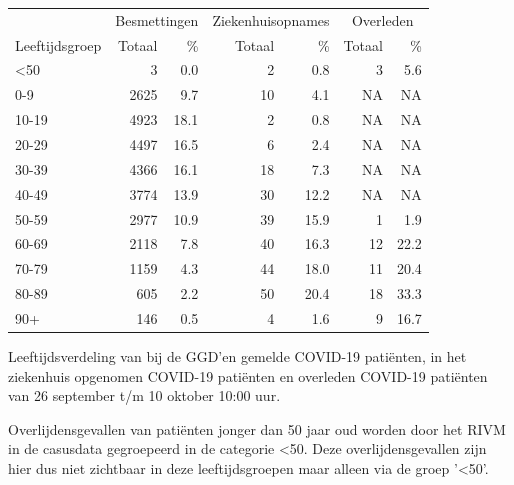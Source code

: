 \documentclass[
  english,
  man,floatsintext]{apa6}
\begin{document}
\begin{table}
\centering\begingroup\fontsize{11}{13}\selectfont

\begin{threeparttable}
\begin{tabular}{lrrrrrr}
\toprule
\multicolumn{1}{c}{ } & \multicolumn{2}{c}{Besmettingen} & \multicolumn{2}{c}{Ziekenhuisopnames} & \multicolumn{2}{c}{Overleden} \\
\cmidrule(l{3pt}r{3pt}){2-3} \cmidrule(l{3pt}r{3pt}){4-5} \cmidrule(l{3pt}r{3pt}){6-7}
Leeftijdsgroep & Totaal & \% & Totaal & \% & Totaal & \%\\
\midrule
<50 & 3 & 0.0 & 2 & 0.8 & 3 & 5.6\\
0-9 & 2625 & 9.7 & 10 & 4.1 & NA & NA\\
10-19 & 4923 & 18.1 & 2 & 0.8 & NA & NA\\
20-29 & 4497 & 16.5 & 6 & 2.4 & NA & NA\\
30-39 & 4366 & 16.1 & 18 & 7.3 & NA & NA\\
40-49 & 3774 & 13.9 & 30 & 12.2 & NA & NA\\
50-59 & 2977 & 10.9 & 39 & 15.9 & 1 & 1.9\\
60-69 & 2118 & 7.8 & 40 & 16.3 & 12 & 22.2\\
70-79 & 1159 & 4.3 & 44 & 18.0 & 11 & 20.4\\
80-89 & 605 & 2.2 & 50 & 20.4 & 18 & 33.3\\
90+ & 146 & 0.5 & 4 & 1.6 & 9 & 16.7\\
\bottomrule
\end{tabular}
\begin{tablenotes}
\item[1] Leeftijdsverdeling van bij de GGD’en gemelde COVID-19 patiënten, in het ziekenhuis opgenomen COVID-19 patiënten en overleden COVID-19 patiënten van 26 september t/m 10 oktober 10:00 uur.
\item[2] Overlijdensgevallen van patiënten jonger dan 50 jaar oud worden door het RIVM in de casusdata gegroepeerd in de categorie <50. Deze overlijdensgevallen zijn hier dus niet zichtbaar in deze leeftijdsgroepen maar alleen via de groep '<50'.
\end{tablenotes}
\end{threeparttable}
\endgroup{}
\end{table}

\newpage
\end{document}
